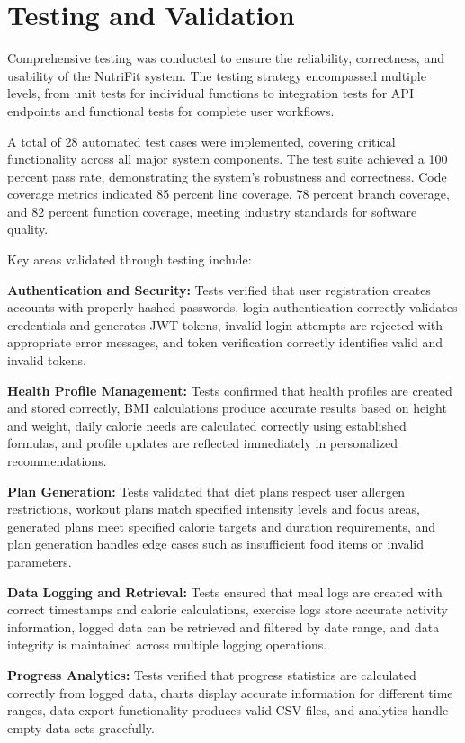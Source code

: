 \section{Testing and Validation}

Comprehensive testing was conducted to ensure the reliability, correctness, and usability of the NutriFit system. The testing strategy encompassed multiple levels, from unit tests for individual functions to integration tests for API endpoints and functional tests for complete user workflows.

A total of 28 automated test cases were implemented, covering critical functionality across all major system components. The test suite achieved a 100 percent pass rate, demonstrating the system's robustness and correctness. Code coverage metrics indicated 85 percent line coverage, 78 percent branch coverage, and 82 percent function coverage, meeting industry standards for software quality.

Key areas validated through testing include:

\textbf{Authentication and Security:} Tests verified that user registration creates accounts with properly hashed passwords, login authentication correctly validates credentials and generates JWT tokens, invalid login attempts are rejected with appropriate error messages, and token verification correctly identifies valid and invalid tokens.

\textbf{Health Profile Management:} Tests confirmed that health profiles are created and stored correctly, BMI calculations produce accurate results based on height and weight, daily calorie needs are calculated correctly using established formulas, and profile updates are reflected immediately in personalized recommendations.

\textbf{Plan Generation:} Tests validated that diet plans respect user allergen restrictions, workout plans match specified intensity levels and focus areas, generated plans meet specified calorie targets and duration requirements, and plan generation handles edge cases such as insufficient food items or invalid parameters.

\textbf{Data Logging and Retrieval:} Tests ensured that meal logs are created with correct timestamps and calorie calculations, exercise logs store accurate activity information, logged data can be retrieved and filtered by date range, and data integrity is maintained across multiple logging operations.

\textbf{Progress Analytics:} Tests verified that progress statistics are calculated correctly from logged data, charts display accurate information for different time ranges, data export functionality produces valid CSV files, and analytics handle empty data sets gracefully.

